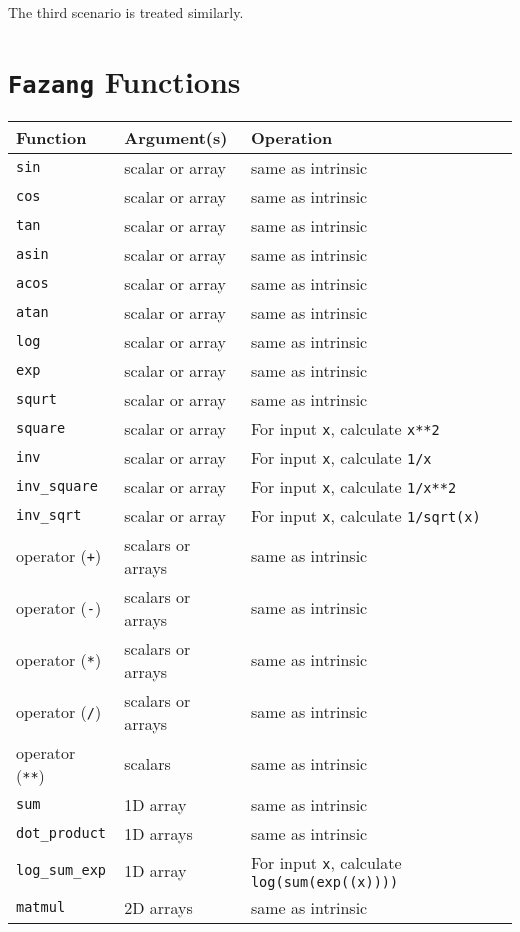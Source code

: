 \documentclass[12pt, reqno, oneside]{amsbook}
\begin{document}
The third scenario is treated similarly.

\appendix
\chapter{\texttt{Fazang} Functions \label{sec:func_list}}
\label{sec:org4fec50b}
\label{appendix:func}  
\begin{center}
\begin{tabular}{lll}
Function & Argument(s) & Operation\\
\hline
\texttt{sin} & scalar or array & same as intrinsic\\
\texttt{cos} & scalar or array & same as intrinsic\\
\texttt{tan} & scalar or array & same as intrinsic\\
\texttt{asin} & scalar or array & same as intrinsic\\
\texttt{acos} & scalar or array & same as intrinsic\\
\texttt{atan} & scalar or array & same as intrinsic\\
\texttt{log} & scalar or array & same as intrinsic\\
\texttt{exp} & scalar or array & same as intrinsic\\
\texttt{squrt} & scalar or array & same as intrinsic\\
\texttt{square} & scalar or array & For input \texttt{x}, calculate \texttt{x**2}\\
\texttt{inv} & scalar or array & For input \texttt{x}, calculate \texttt{1/x}\\
\texttt{inv\_square} & scalar or array & For input \texttt{x}, calculate \texttt{1/x**2}\\
\texttt{inv\_sqrt} & scalar or array & For input \texttt{x}, calculate \texttt{1/sqrt(x)}\\
operator (\texttt{+}) & scalars or arrays & same as intrinsic\\
operator (\texttt{-}) & scalars or arrays & same as intrinsic\\
operator (\texttt{*}) & scalars or arrays & same as intrinsic\\
operator (\texttt{/}) & scalars or arrays & same as intrinsic\\
operator (\texttt{**}) & scalars & same as intrinsic\\
\texttt{sum} & 1D array & same as intrinsic\\
\texttt{dot\_product} & 1D arrays & same as intrinsic\\
\texttt{log\_sum\_exp} & 1D array & For input \texttt{x}, calculate \texttt{log(sum(exp((x))))}\\
\texttt{matmul} & 2D arrays & same as intrinsic\\
\end{tabular}
\end{center}



\end{document}
